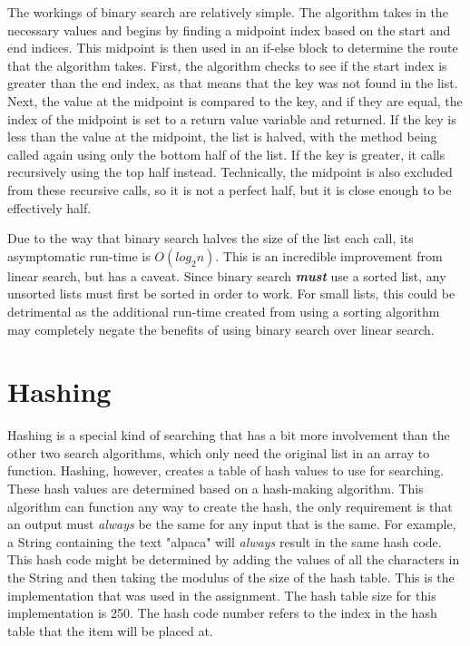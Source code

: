 \documentclass[letterpaper, 10pt,DIV=13]{scrartcl}
\numberwithin{equation}{section} %
\numberwithin{figure}{section} %
\numberwithin{table}{section} %
\begin{document}
The workings of binary search are relatively simple. The algorithm takes in the necessary values and begins by finding a midpoint index based on the start and end indices. This midpoint is then used in an if-else block to determine the route that the algorithm takes. First, the algorithm checks to see if the start index is greater than the end index, as that means that the key was not found in the list. Next, the value at the midpoint is compared to the key, and if they are equal, the index of the midpoint is set to a return value variable and returned. If the key is less than the value at the midpoint, the list is halved, with the method being called again using only the bottom half of the list. If the key is greater, it calls recursively using the top half instead. Technically, the midpoint is also excluded from these recursive calls, so it is not a perfect half, but it is close enough to be effectively half.

Due to the way that binary search halves the size of the list each call, its asymptomatic run-time is $O(log_2n)$. This is an incredible improvement from linear search, but has a caveat. Since binary search \textbf{\textit{must}} use a sorted list, any unsorted lists must first be sorted in order to work. For small lists, this could be detrimental as the additional run-time created from using a sorting algorithm may completely negate the benefits of using binary search over linear search.

\section{Hashing}
Hashing is a special kind of searching that has a bit more involvement than the other two search algorithms, which only need the original list in an array to function. Hashing, however, creates a table of hash values to use for searching. These hash values are determined based on a hash-making algorithm. This algorithm can function any way to create the hash, the only requirement is that an output must \textit{always} be the same for any input that is the same. For example, a String containing the text "alpaca" will \textit{always} result in the same hash code. This hash code might be determined by adding the values of all the characters in the String and then taking the modulus of the size of the hash table. This is the implementation that was used in the assignment. The hash table size for this implementation is 250. The hash code number refers to the index in the hash table that the item will be placed at.
\end{document}
